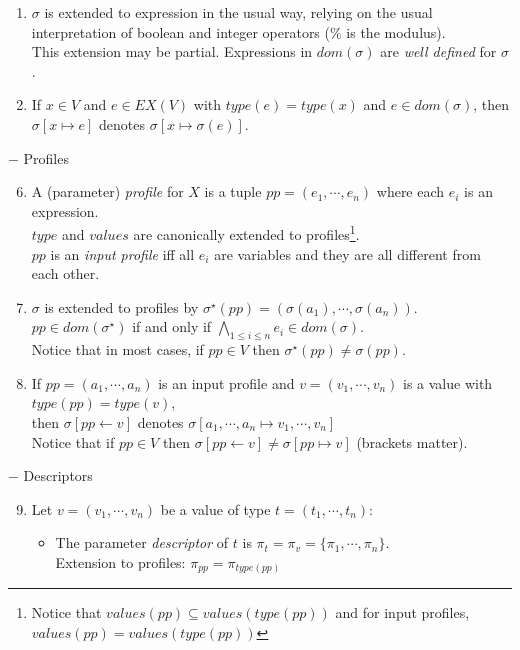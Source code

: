 \documentclass{article}
\begin{document}
\begin{definition}
\begin{enumerate}
\item $\sigma$ is extended to expression in the usual way, relying on the usual interpretation of boolean and integer operators  ($\%$ is the modulus).\\
			This extension may be partial. Expressions in $dom(\sigma)$ are {\em well defined} for $\sigma$.
\item If $x\in V$ and $e\in EX(V)$ with $type(e)=type(x)$ and $e\in dom(\sigma)$, then\\ $\sigma[x\mapsto e]$ denotes $\sigma[x\mapsto\sigma(e)]$.
\end{enumerate}
$-$ Profiles
\begin{enumerate}\setcounter{enumi}{5}
\item A (parameter) {\em profile} for $X$ is a tuple $pp=(e_1,\cdots,e_n)$ where each $e_i$ is an expression.\\
      $type$ and $values$ are canonically extended to profiles\footnote{Notice that $values(pp)\subseteq values(type(pp))$ and for input profiles, $values(pp)= values(type(pp))$}.\\
      $pp$ is an {\em input profile} iff all $e_i$ are variables and they are all different from each other.
\item $\sigma$ is extended to profiles by $\sigma^\star(pp)=(\sigma(a_1),\cdots,\sigma(a_n))$.\\
      $pp\in dom(\sigma^{\star})$ if and only if $\bigwedge_{1\leq i\leq n}e_i\in dom(\sigma)$.\\
      Notice that in most cases, if $pp\in V$ then $\sigma^\star(pp)\neq\sigma(pp)$.
\item  If $pp=(a_1,\cdots,a_n)$ is an input profile and $v=(v_1,\cdots,v_n)$ is a value with $type(pp)=type(v)$,\\ then $\sigma[pp\leftarrow v]$ denotes $\sigma[a_1,\cdots,a_n\mapsto v_1,\cdots,v_n]$\\
      Notice that  if $pp\in V$ then $\sigma[pp\leftarrow v]\neq\sigma[pp\mapsto v]$ (brackets matter).
\end{enumerate}
$-$ Descriptors
\begin{enumerate}\setcounter{enumi}{8}
\item Let $v=(v_1,\cdots,v_n)$ be a value of type $t=(t_1,\cdots,t_n)$:
\begin{itemize}
\item The parameter {\em descriptor} of $t$ is $\pi_{t}=\pi_v=\{\pi_1,\cdots,\pi_{n}\}$.\\
      Extension to profiles: $\pi_{pp}=\pi_{type(pp)}$

\end{itemize}
\end{enumerate}
\end{definition}
\end{document}
